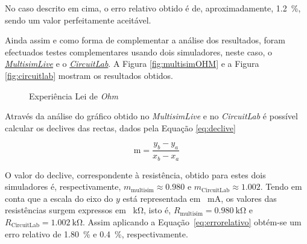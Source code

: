 No caso descrito em cima, o erro relativo obtido é de, aproximadamente, \SI{1.2}{\percent}, sendo um valor perfeitamente aceitável.

Ainda assim e como forma de complementar a análise dos resultados, foram efectuados testes complementares usando dois simuladores, neste caso, o \href{https://www.multisim.com}{\textit{MultisimLive}} e o \href{https://www.circuitlab.com/}{\textit{CircuitLab}}. A Figura \ref{fig:multisimOHM} e a Figura \ref{fig:circuitlab} mostram os resultados obtidos.

\begin{figure}[hbtp]
	\centering%
		\centering
		\qquad
		\caption{Experiência Lei de \textit{Ohm}}%
		\label{fig:experienciaOHM_simuladores}%
	\end{figure}

Através da análise do gráfico obtido no \textit{MultisimLive} e no \textit{CircuitLab} é possível calcular os declives das rectas, dados pela Equação \ref{eq:declive}

\begin{equation} \label{eq:declive}
	\text{m} = \frac{y_{b} - y_{a}}{x_{b} - x_{a}}
\end{equation}

O valor do declive, correspondente à resistência, obtido para estes dois simuladores é, respectivamente, $m_\text{{multisim}} \approx{0.980}$ e $m_{\text{CircuitLab}} \approx{1.002}$. Tendo em conta que a escala do eixo do $y$ está representada em \SI{}{\milli\ampere}, os valores das resistências surgem expressos em \SI{}{\kilo\ohm}, isto é, $R_\text{{multisim}} = \SI{0.980}{\kilo\ohm}$ e $R_{\text{CircuitLab}} = \SI{1.002}{\kilo\ohm}$.  Assim aplicando a Equação~\ref{eq:errorelativo} obtém-se um erro relativo de \SI{1.80}{\percent} e \SI{0.4}{\percent}, respectivamente.

